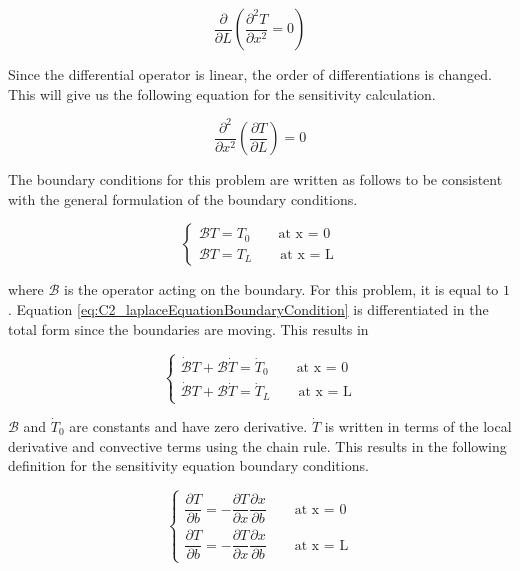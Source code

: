 \begin{equation}\label{eq:C2_differentiatedLaplaceEquation}
	\frac{\partial}{\partial L}
	\left( \frac{\partial^2 T}{\partial x^2} = 0 \right)
\end{equation}

Since the differential operator is linear, the order of differentiations is changed. This will give us the following equation for the sensitivity calculation.

\begin{equation}\label{eq:C2_laplaceSAequation}
	\frac{\partial^2}{\partial x^2} \left( \frac{\partial T}{\partial L} \right) = 0
\end{equation}

The boundary conditions for this problem are written as follows to be consistent with the general formulation of the boundary conditions. 

\begin{equation}\label{eq:C2_laplaceEquationBoundaryCondition}
\begin{cases}
	\mathcal{B}T = T_0 \qquad \text{at x = 0} \\
	\mathcal{B}T = T_L \qquad \text{at x = L}
\end{cases}
\end{equation}

where $\mathcal{B}$ is the operator acting on the boundary. For this problem, it is equal to $1$. Equation \eqref{eq:C2_laplaceEquationBoundaryCondition} is differentiated in the total form since the boundaries are moving. This results in

\begin{equation}
\begin{cases}
	\dot{\mathcal{B}} T + \mathcal{B} \dot{T} = \dot{T}_0 \qquad \text{at x = 0} \\
	\dot{\mathcal{B}} T + \mathcal{B} \dot{T} = \dot{T}_L \qquad \text{at x = L}
\end{cases}
\end{equation}

$\mathcal{B}$ and $\dot{T}_0$ are constants and have zero derivative. $\dot{T}$ is written in terms of the local derivative and convective terms using the chain rule. This results in the following definition for the sensitivity equation boundary conditions.

\begin{equation*}
\begin{cases}
	\dfrac{\partial T}{\partial b} = -\dfrac{\partial T}{\partial x} \dfrac{\partial x}{\partial b} \qquad \text{at x = 0}
	\\
	\dfrac{\partial T}{\partial b} = -\dfrac{\partial T}{\partial x} \dfrac{\partial x}{\partial b} \qquad \text{at x = L}
\end{cases}
\end{equation*}

